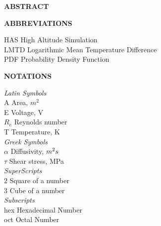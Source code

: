 \documentclass[12pt,a4paper]{report}
\begin{document}
\newpage


{\centering \textbf{\Large ABSTRACT} \par }
\vspace{.5cm}
\lipsum[1-2]

\break
\vspace{-150cm}
\tableofcontents

\newpage
{}
\listoffigures 

\newpage
\listoftables
{}

\newpage
{\centering \textbf{\Large ABBREVIATIONS} \par }
\vspace{.35in}
\noindent
HAS \tab High Altitude Simulation \\
LMTD \tab Logarithmic Mean Temperature Difference \\
PDF \tab Probability Density Function \\




\newpage
{\centering \textbf{\Large NOTATIONS}  \par }
\vspace{.25in}
\noindent %
\break\textit{Latin Symbols} \\
A \tab \tab Area, $m^{2}$ \\
E \tab \tab Voltage, V \\
$R_{e}$ \tab \tab Reynolds number \\
T \tab \tab Temperature, K \\
\break\textit{Greek Symbols} \\
$\alpha$ \tab \tab Diffusivity, $m^{2}\/s$ \\
$\tau$ \tab \tab Shear stress, MPa \\
\break\textit{SuperScripts} \\
2 \tab \tab Square of a number \\
3 \tab \tab Cube of a number \\
\break \textit{Subscripts} \\
hex \tab Hexadecimal Number \\
oct \tab Octal Number

\end{document}
